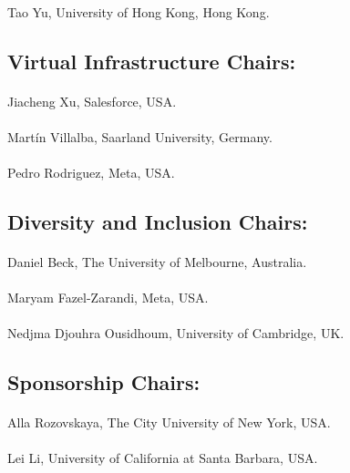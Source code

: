 \paragraph{} Tao Yu, University of Hong Kong, Hong Kong. 

\subsection*{Virtual Infrastructure Chairs:} 
\paragraph{} Jiacheng Xu, Salesforce, USA. 
\paragraph{} Martín Villalba, Saarland University, Germany. 
\paragraph{} Pedro Rodriguez, Meta, USA.

\subsection*{Diversity and Inclusion Chairs:}
\paragraph{} Daniel Beck, The University of Melbourne, Australia. 
\paragraph{} Maryam Fazel-Zarandi, Meta, USA. 
\paragraph{} Nedjma Djouhra Ousidhoum, University of Cambridge, UK. 

\subsection*{Sponsorship Chairs:}
\paragraph{} Alla Rozovskaya, The City University of New York, USA.
\paragraph{} Lei Li, University of California at Santa Barbara, USA. 

